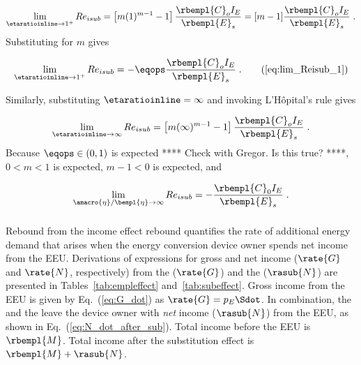 \begin{equation}
  \lim_{\etaratioinline \to 1^{+}} Re_{isub} 
        = \left[ m ( 1 )^{m-1} - 1 \right] \frac{\rbempl{C}_o I_E}{\rbempl{E}_s}
        = [m - 1] \frac{\rbempl{C}_o I_E}{\rbempl{E}_s} \; .
\end{equation}
%
Substituting for $m$ gives

\begin{equation}
  \lim_{\etaratioinline \to 1^{+}} Re_{isub} 
        = -\eqops \frac{\rbempl{C}_o I_E}{\rbempl{E}_s} \; . \tag{\ref{eq:lim_Reisub_1}}
\end{equation}

Similarly, 
substituting $\etaratioinline = \infty$ and invoking L'H\^{o}pital's rule gives

\begin{equation}
  \lim_{\etaratioinline \to \infty} Re_{isub} 
        = \left[ m ( \infty )^{m-1} - 1 \right] \frac{\rbempl{C}_o I_E}{\rbempl{E}_s} \; .
\end{equation}
%
Because $\eqops \in (0, 1)$ is expected **** Check with Gregor.  Is this true? ****,
$0 < m < 1$ is expected, $m - 1 < 0$ is expected, and

\begin{equation}
  \lim_{\amacro{\eta}/\bempl{\eta} \to \infty} Re_{isub} = -\frac{\rbempl{C}_0 I_E}{\rbempl{E}_s} \; .
\end{equation}


\subsubsection{\Inceffect{}} 
\label{sec:Re_inc}

Rebound from the income effect rebound quantifies the rate of additional energy demand 
that arises when the energy conversion device owner spends net
income from the EEU.
Derivations of expressions for gross and net income ($\rate{G}$ and $\rate{N}$, respectively) from the 
\empleffect{} ($\rate{G}$) and the \subeffect{} ($\rasub{N}$)
are presented in Tables~\ref{tab:empleffect} and~\ref{tab:subeffect}.
Gross income from the EEU is given by Eq.~(\ref{eq:G_dot})
as $\rate{G} = p_E \Sdot$. 
In combination, the \empleffect{} and the \subeffect{} leave the device owner with
\emph{net} income ($\rasub{N}$) from the EEU,
as shown in Eq.~(\ref{eq:N_dot_after_sub}).
Total income before the EEU is $\rbempl{M}$.
Total income after the substitution effect is $\rbempl{M} + \rasub{N}$.

